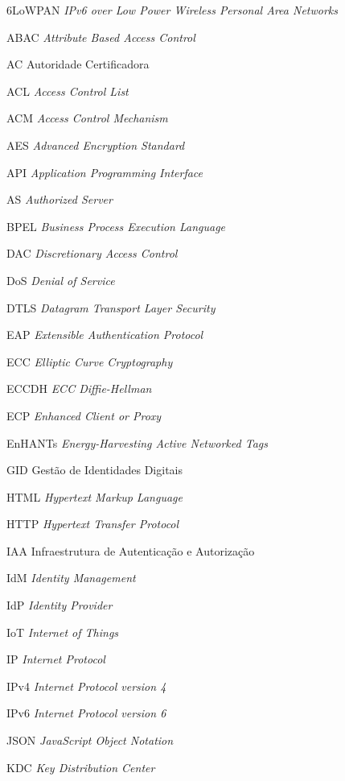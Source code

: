 \begin{siglas}
\item[6LoWPAN]{\textit{IPv6 over Low Power Wireless Personal Area Networks}}
\item[ABAC]{\textit{Attribute Based Access Control}}	 
\item[AC]{Autoridade Certificadora}
\item[ACL]{\textit{Access Control List}}
\item[ACM]{\textit{Access Control Mechanism}}
\item[AES]{\textit{Advanced Encryption Standard}}
\item[API]{\textit{Application Programming Interface}}
\item[AS]{\textit{Authorized Server}}
\item[BPEL]{\textit{Business Process Execution Language}}
\item[DAC]{\textit{Discretionary Access Control}}	
\item[DoS]{\textit{Denial of Service}}	
\item[DTLS]{\textit{Datagram Transport Layer Security}}
\item[EAP]{\textit{Extensible Authentication Protocol}}	
\item[ECC]{\textit{Elliptic Curve Cryptography}}
\item[ECCDH]{\textit{ECC Diffie-Hellman}}
\item[ECP]{\textit{Enhanced Client or Proxy}}
\item[EnHANTs]{\textit{Energy-Harvesting Active Networked Tags}}
\item[GID]{Gestão de Identidades Digitais}
\item[HTML]{\textit{Hypertext Markup Language}}
\item[HTTP]{\textit{Hypertext Transfer Protocol}}
\item[IAA]{Infraestrutura de Autenticação e Autorização}
\item[IdM]{\textit{Identity Management}}
\item[IdP]{\textit{Identity Provider}}
\item[IoT]{\textit{Internet of Things}}
\item[IP]{\textit{Internet Protocol}}
\item[IPv4]{\textit{Internet Protocol version 4}}
\item[IPv6]{\textit{Internet Protocol version 6}}
\item[JSON]{\textit{JavaScript Object Notation}}
\item[KDC]{\textit{Key Distribution Center}}

\end{siglas}
